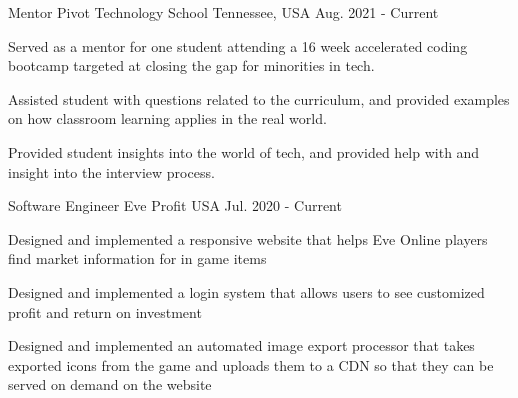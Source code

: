 

\begin{cventries}

  \cventry
    {Mentor} %
    {Pivot Technology School} %
    {Tennessee, USA} %
    {Aug. 2021 - Current} %
    {
      \begin{cvitems} %
        \item {Served as a mentor for one student attending a 16 week accelerated coding bootcamp targeted at closing the gap for minorities in tech.}
        \item {Assisted student with questions related to the curriculum, and provided examples on how classroom learning applies in the real world.}
        \item {Provided student insights into the world of tech, and provided help with and insight into the interview process.}
      \end{cvitems}
    }

  \cventry
    {Software Engineer} %
    {Eve Profit} %
    {USA} %
    {Jul. 2020 - Current} %
    {
      \begin{cvitems} %
        \item {Designed and implemented a responsive website that helps Eve Online players find market information for in game items}
        \item {Designed and implemented a login system that allows users to see customized profit and return on investment}
        \item {Designed and implemented an automated image export processor that takes exported icons from the game and uploads them to a CDN so that they can be served on demand on the website}
      \end{cvitems}
    }

\end{cventries}
